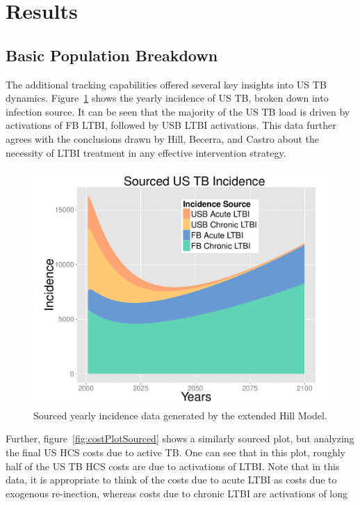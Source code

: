 \documentclass{amsart}
\begin{document}
\section{Results}
\subsection{Basic Population Breakdown}
The additional tracking capabilities offered several key insights into US TB
dynamics. Figure~\ref{fig:incPlotSourced} shows the yearly incidence of US TB, broken
down into infection source. It can be seen that the majority of the US TB load
is driven by activations of FB LTBI, followed by USB LTBI activations. This data
further agrees with the conclusions drawn by Hill, Becerra, and Castro about the
necessity of LTBI treatment in any effective intervention strategy. 
\begin{figure}[h]
  \begin{center}
    \includegraphics[scale=.5]{incPlotSourced}
  \end{center}
  \caption{Sourced yearly incidence data generated by the extended Hill Model.}
  \label{fig:incPlotSourced}
\end{figure}
Further, figure~\ref{fig:costPlotSourced} shows a similarly sourced plot, but analyzing the
final US HCS costs due to active TB. One can see that in this plot, roughly half
of the US TB HCS costs are due to activations of LTBI. Note that in this data,
it is appropriate to think of the costs due to acute LTBI as costs due to
exogenous re-inection, whereas costs due to chronic LTBI are activations of long
\end{document}
